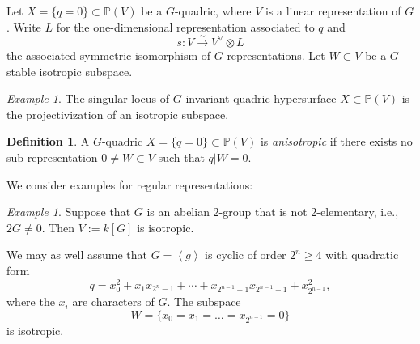 \documentclass[12pt]{amsart}
\numberwithin{equation}{section}
\newcommand{\lra}{\longrightarrow}
\newcommand{\bP}{\mathbb{P}}
\theoremstyle{plain}
\theoremstyle{definition}
\newtheorem{defi}[prop]{Definition}
\theoremstyle{remark}
\newtheorem{exam}[prop]{Example}
\begin{document}
Let $X=\{q=0\} \subset \bP(V)$ be a $G$-quadric, where $V$ is a linear representation of $G$.
Write $L$ for the one-dimensional representation associated to $q$ and
$$s:V \stackrel{\sim}{\lra} V^{\vee}\otimes L$$
the associated symmetric isomorphism of $G$-representations.
Let $W \subset V$ be a $G$-stable isotropic subspace.

\begin{exam}
The singular locus of $G$-invariant quadric hypersurface $X \subset \bP(V)$ is the
projectivization of an isotropic subspace.  
\end{exam}



\begin{defi}
A $G$-quadric $X=\{q=0\}\subset \bP(V)$ is {\em anisotropic} if 
there exists no sub-representation $0\neq W \subset V$ such that $q|W=0$. 
\end{defi}

We consider examples for regular representations:
\begin{exam}
Suppose that $G$ is an abelian $2$-group that is not $2$-elementary,
i.e., $2G \neq 0$. Then $V:=k[G]$ is isotropic.

We may as well assume that $G=\left<g\right>$ is cyclic of order
$2^n\ge 4$ with quadratic form
$$q=x_0^2+x_1x_{2^n-1}+\cdots + x_{2^{n-1}-1}x_{2^{n-1}+1}
+x_{2^{n-1}}^2,
$$
where the $x_i$ are characters of $G$.  
The subspace 
$$
W=\{x_0=x_1=\ldots = x_{2^{n-1}}=0\}
$$
is isotropic.  
\end{exam}
\end{document}
